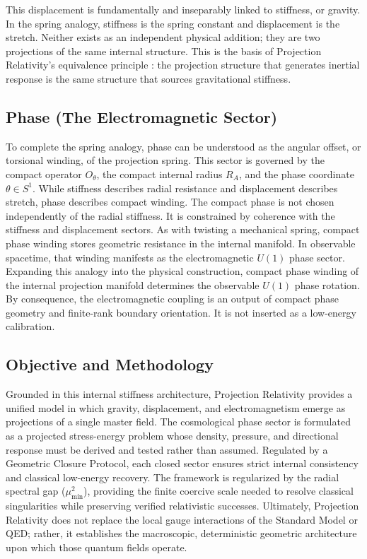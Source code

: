 \documentclass[11pt]{article}
\begin{document}
This displacement is fundamentally and inseparably linked to stiffness, or gravity. In the spring analogy, stiffness is the spring constant and displacement is the stretch. Neither exists as an independent physical addition; they are two projections of the same internal structure. This is the basis of Projection Relativity's equivalence principle \cite{Einstein1911}: the projection structure that generates inertial response is the same structure that sources gravitational stiffness.

\subsection{Phase (The Electromagnetic Sector)}

To complete the spring analogy, phase can be understood as the angular offset, or torsional winding, of the projection spring. This sector is governed by the compact operator \(O_\theta\), the compact internal radius \(R_A\), and the phase coordinate \(\theta\in S^1\). While stiffness describes radial resistance and displacement describes stretch, phase describes compact winding. The compact phase is not chosen independently of the radial stiffness. It is constrained by coherence with the stiffness and displacement sectors. As with twisting a mechanical spring, compact phase winding stores geometric resistance in the internal manifold. In observable spacetime, that winding manifests as the electromagnetic \(U(1)\) phase sector. Expanding this analogy into the physical construction, compact phase winding of the internal projection manifold determines the observable \(U(1)\) phase rotation. By consequence, the electromagnetic coupling is an output of compact phase geometry and finite-rank boundary orientation. It is not inserted as a low-energy calibration.

\subsection{Objective and Methodology}
Grounded in this internal stiffness architecture, Projection Relativity provides a unified model in which gravity, displacement, and electromagnetism emerge as projections of a single master field. The cosmological phase sector is formulated as a projected stress-energy problem whose density, pressure, and directional response must be derived and tested rather than assumed. Regulated by a Geometric Closure Protocol, each closed sector ensures strict internal consistency and classical low-energy recovery. The framework is regularized by the radial spectral gap ($\mu_{\min}^2$), providing the finite coercive scale needed to resolve classical singularities while preserving verified relativistic successes. Ultimately, Projection Relativity does not replace the local gauge interactions of the Standard Model or QED; rather, it establishes the macroscopic, deterministic geometric architecture upon which those quantum fields operate.
\end{document}
